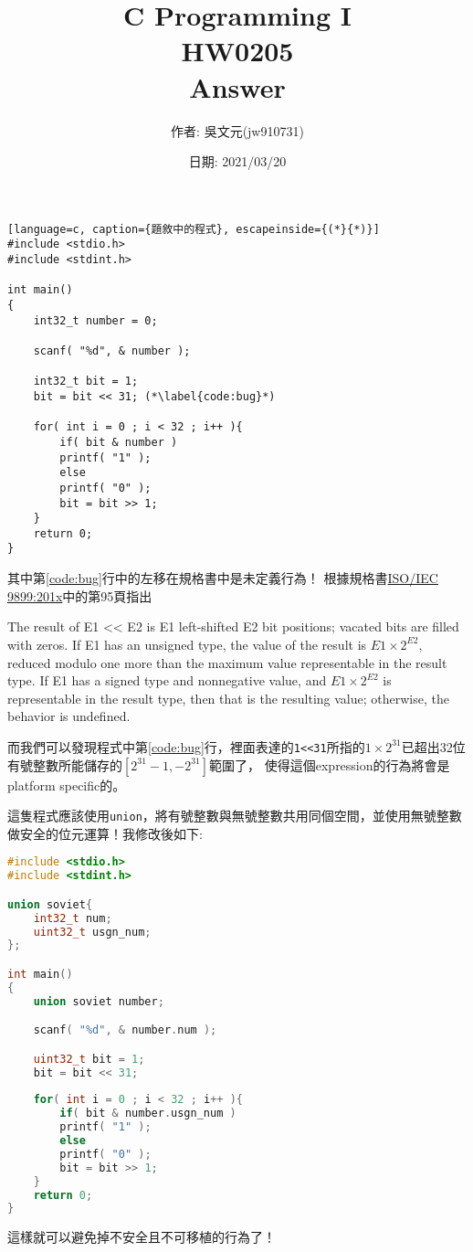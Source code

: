 \documentclass[a4paper,10pt]{article}
\title{C Programming I\\HW0205\\Answer}
\author{作者: 吳文元(jw910731)}
\date{日期: 2021/03/20}
\begin{document}
\maketitle
\begin{lstlisting}[language=c, caption={題敘中的程式}, escapeinside={(*}{*)}]
#include <stdio.h>
#include <stdint.h>

int main()
{
    int32_t number = 0;

    scanf( "%d", & number );

    int32_t bit = 1;
    bit = bit << 31; (*\label{code:bug}*)
    
    for( int i = 0 ; i < 32 ; i++ ){
        if( bit & number )
        printf( "1" );
        else
        printf( "0" );
        bit = bit >> 1;
    }
    return 0;
}
\end{lstlisting}
其中第\ref{code:bug}行中的左移在規格書中是未定義行為！
根據規格書\href{https://drive.google.com/file/d/1BGSbEazY5azERlFtP9DfmTTHgj-0AjY7/view}{ISO/IEC 9899:201x}中的第95頁指出
\begin{displayquote}
The result of E1 << E2 is E1 left-shifted E2 bit positions; vacated bits are filled with
zeros. If E1 has an unsigned type, the value of the result is \(E1 × 2^{E2}\), reduced modulo
one more than the maximum value representable in the result type. If E1 has a signed
type and nonnegative value, and \(E1 × 2^{E2}\) is representable in the result type, then that is
the resulting value; otherwise, the behavior is undefined.
\end{displayquote}
而我們可以發現程式中第\ref{code:bug}行，裡面表達的\lstinline{1<<31}所指的\(1\times 2^{31}\)已超出32位有號整數所能儲存的\([2^{31}-1, -2^{31}]\)範圍了，
使得這個expression的行為將會是platform specific的。

這隻程式應該使用\lstinline{union}，將有號整數與無號整數共用同個空間，並使用無號整數做安全的位元運算！我修改後如下:

\begin{lstlisting}[language=c, caption={修改後的的程式}]
#include <stdio.h>
#include <stdint.h>

union soviet{
    int32_t num;
    uint32_t usgn_num;
};

int main()
{
    union soviet number;

    scanf( "%d", & number.num );

    uint32_t bit = 1;
    bit = bit << 31;
    
    for( int i = 0 ; i < 32 ; i++ ){
        if( bit & number.usgn_num )
        printf( "1" );
        else
        printf( "0" );
        bit = bit >> 1;
    }
    return 0;
}
\end{lstlisting}
這樣就可以避免掉不安全且不可移植的行為了！
\end{document}
